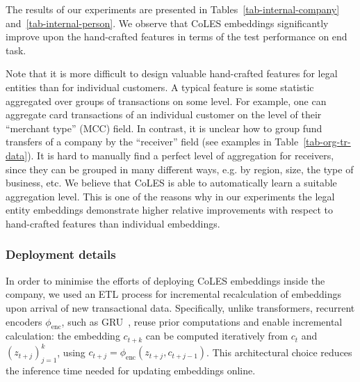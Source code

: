\documentclass[sigconf, anonymous]{acmart}
\begin{document}
The results of our experiments are presented in Tables~\ref{tab-internal-company} and~\ref{tab-internal-person}.
We observe that CoLES embeddings significantly improve upon the hand-crafted features in terms
of the test performance on end task.

Note that it is more difficult to design valuable hand-crafted features for legal entities than
for individual customers. A typical feature is some statistic aggregated over groups of transactions
on some level. For example, one can aggregate card transactions of an individual customer on
the level of their ``merchant type'' (MCC) field. In contrast, it is unclear how to group fund
transfers of a company by the ``receiver'' field (see examples in Table~\ref{tab-org-tr-data}).
% 
It is hard to manually find a perfect level of aggregation for receivers, since they can be grouped
in many different ways, e.g. by region, size, the type of business, etc. We believe that CoLES is
able to automatically learn a suitable aggregation level. This is one of the reasons why in our
experiments the legal entity embeddings demonstrate higher relative improvements with respect to
hand-crafted features than individual embeddings.

\subsubsection{Deployment details} \label{sec-deployment}


In order to minimise the efforts of deploying CoLES embeddings inside the company, we used
an ETL process for incremental recalculation of embeddings upon arrival of new transactional data.
% 
Specifically, unlike transformers, recurrent encoders $\phi_{\mathrm{enc}}$, such as
GRU~\citep{Cho2014LearningPR}, reuse prior computations and enable incremental calculation:
the embedding $c_{t + k}$ can be computed iteratively from $c_t$ and $(z_{t+j})_{j=1}^k$,
using $c_{t + j} = \phi_{\mathrm{enc}}(z_{t + j}, c_{t+j-1})$. This architectural choice
reduces the inference time needed for updating embeddings online. 
\end{document}
